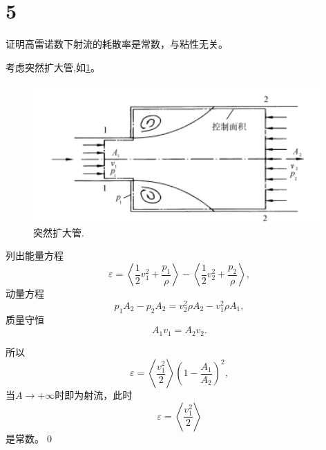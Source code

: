 \documentclass[12pt]{ctexart}
\begin{document}
\section{5}

证明高雷诺数下射流的耗散率是常数，与粘性无关。

考虑突然扩大管,如\cref{fig:5kuo}。
\begin{figure}[htp]
	\centering
	\includegraphics[width=11cm]{kuo.png}
	\caption{突然扩大管.}
	\label{fig:5kuo}
\end{figure}

列出能量方程
\begin{equation}
	\varepsilon = \left\langle \frac{1}{2} v_1^2 + \frac{p_1}{\rho}\right\rangle - \left\langle \frac{1}{2} v_2^2 + \frac{p_2}{\rho} \right\rangle,
\end{equation}
动量方程
\begin{equation}
	p_1 A_2 - p_2 A_2 = v_2^2 \rho A_2 - v_1^2 \rho A_1,
\end{equation}
质量守恒
\begin{equation}
	A_1 v_1 = A_2 v_2.
\end{equation}

所以
\begin{equation}
	\varepsilon = \left\langle \frac{v_1^2}{2}\right\rangle \left(1-\frac{A_1}{A_2}\right)^2,
\end{equation}
当$A\to +\infty$时即为射流，此时
\begin{equation}
	\varepsilon = \left\langle \frac{v_1^2}{2}\right\rangle
\end{equation}
是常数。\qed









\nocite{*}


\end{document}
